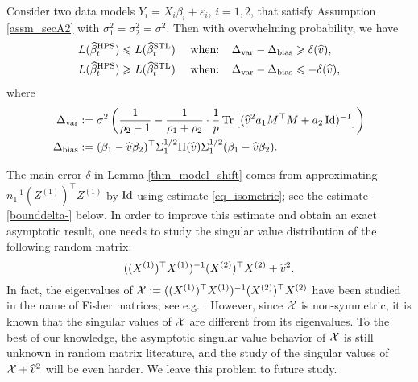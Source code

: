 \begin{lemma}%
\label{thm_model_shift}
Consider two data models $Y_i = X_i\beta_i + \varepsilon_i$, $i=1,2$, that satisfy Assumption \ref{assm_secA2} with $\sigma_1^2=\sigma_2^2=\sigma^2$. Then with overwhelming probability, we have
	\begin{align}
	 	\te(\wh{\beta}_{t}^{\MTL}) \le \te(\wh{\beta}_t^{\STL}) \quad \text{ when: } \ \ &\Delta_{\vari} - \Delta_{\bias} \ge   \delta(\wh v), \label{upper}\\
		\te(\wh{\beta}_t^{\MTL}) \ge \te(\wh{\beta}_t^{\STL}) \quad \text{ when: } \ \ &\Delta_{\vari} - \Delta_{\bias} \le - \delta(\wh v), \label{lower}
	\end{align}
	where
	\begin{align} %
		\Delta_{\vari} &\define {\sigma^2}\bigbrace{\frac{1}{\rho_2 - 1} -  \frac{1}{\rho_1 + \rho_2}\cdot \frac1p \bigtr{( \wh v^2 a_1 M^{\top}M +  a_2\id)^{-1}} } \label{Deltavarv} \\
		\Delta_{\bias} &\define (\beta_1 - \wh{v}\beta_2)^{\top} \Sigma_1^{1/2} \Pi (\wh v)\Sigma_1^{1/2} (\beta_1 - \wh{v}\beta_2). \label{Deltabetav}
	\end{align}
\end{lemma}



The main error $\delta$ in Lemma \ref{thm_model_shift} comes from approximating $n_1^{-1}(Z^{(1)})^{\top}Z^{(1)}$ by $\id$ using estimate \eqref{eq_isometric}; see the estimate \eqref{bounddelta-} below. In order to improve this estimate and obtain an exact asymptotic result, one needs to study the singular value distribution of the following random matrix:
$$((X^{(1)})^{\top}X^{(1)})^{-1}(X^{(2)})^{\top}X^{(2)} +  \wh{v}^2 .$$
In fact, the eigenvalues of $\cal X:=((X^{(1)})^{\top}X^{(1)})^{-1}(X^{(2)})^{\top}X^{(2)}$ have been studied in the name of Fisher matrices; see e.g. \cite{Fmatrix}. However, since $\cal X$ is non-symmetric, it is known that the singular values of $\cal X$ are different from its eigenvalues. To the best of our knowledge, the asymptotic singular value behavior of $\cal X$ is still unknown in random matrix literature, and the study of the singular values of $\cal X +\wh v^2$ will be even harder. We leave this problem to future study.





